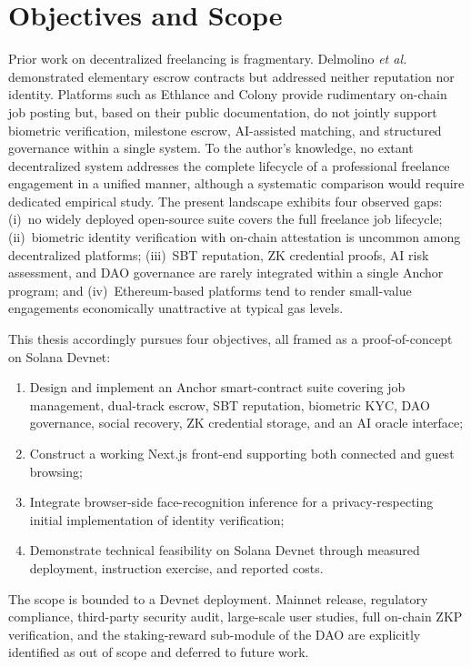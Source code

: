 \section{Objectives and Scope}
\label{section:1.2}

Prior work on decentralized freelancing is fragmentary. Delmolino \emph{et al.}~\cite{delmolino2016step} demonstrated elementary escrow contracts but addressed neither reputation nor identity. Platforms such as Ethlance and Colony provide rudimentary on-chain job posting but, based on their public documentation, do not jointly support biometric verification, milestone escrow, AI-assisted matching, and structured governance within a single system. To the author's knowledge, no extant decentralized system addresses the complete lifecycle of a professional freelance engagement in a unified manner, although a systematic comparison would require dedicated empirical study. The present landscape exhibits four observed gaps: (i)~no widely deployed open-source suite covers the full freelance job lifecycle; (ii)~biometric identity verification with on-chain attestation is uncommon among decentralized platforms; (iii)~SBT reputation, ZK credential proofs, AI risk assessment, and DAO governance are rarely integrated within a single Anchor program; and (iv)~Ethereum-based platforms tend to render small-value engagements economically unattractive at typical gas levels.

This thesis accordingly pursues four objectives, all framed as a proof-of-concept on Solana Devnet:
\begin{enumerate}[noitemsep]
    \item Design and implement an Anchor smart-contract suite covering job management, dual-track escrow, SBT reputation, biometric KYC, DAO governance, social recovery, ZK credential storage, and an AI oracle interface;
    \item Construct a working Next.js front-end supporting both connected and guest browsing;
    \item Integrate browser-side face-recognition inference for a privacy-respecting initial implementation of identity verification;
    \item Demonstrate technical feasibility on Solana Devnet through measured deployment, instruction exercise, and reported costs.
\end{enumerate}

The scope is bounded to a Devnet deployment. Mainnet release, regulatory compliance, third-party security audit, large-scale user studies, full on-chain ZKP verification, and the staking-reward sub-module of the DAO are explicitly identified as out of scope and deferred to future work.

